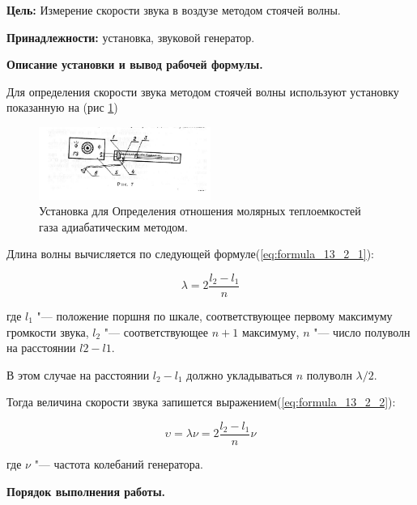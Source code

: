 \textbf{Цель:} Измерение скорости звука в воздузе методом стоячей волны.

\textbf{Принадлежности:} установка, звуковой генератор.

\begin{center}
    \textbf{Описание установки и вывод рабочей формулы.}
\end{center}

Для определения скорости звука методом стоячей волны используют установку показанную на (рис \ref{fig:установка_13_2})

\begin{figure}[!h]
    \centering
    \includegraphics[width = 0.5\textwidth]{image/image13_2.png}
    \caption{Установка для Определения отношения молярных теплоемкостей газа адиабатическим методом.}
    \label{fig:установка_13_2}
\end{figure}

Длина волны вычисляется по следующей формуле(\ref{eq:formula_13_2_1}):

\begin{equation}
    \lambda = 2 \frac{l_2 - l_1}{n}
    \label{eq:formula_13_2_1}
\end{equation}

где $l_1$ "--- положение поршня по шкале, соответствующее первому максимуму громкости звука, $l_2$ "--- соответствующее $n+1$ максимуму, $n$ "--- число полуволн на расстоянии $l2-l1$.

В этом случае на расстоянии $l_2 - l_1$ должно укладываться $n$ полуволн  $\lambda / 2$.

Тогда величина скорости звука запишется выражением(\ref{eq:formula_13_2_2}):

\begin{equation}
    \upsilon = \lambda \nu = 2 \frac{l_2 - l_1}{n} \nu
    \label{eq:formula_13_2_2}
\end{equation}

где $\nu$ "--- частота колебаний генератора.

\begin{center}
    \textbf{Порядок выполнения работы.}
\end{center}

